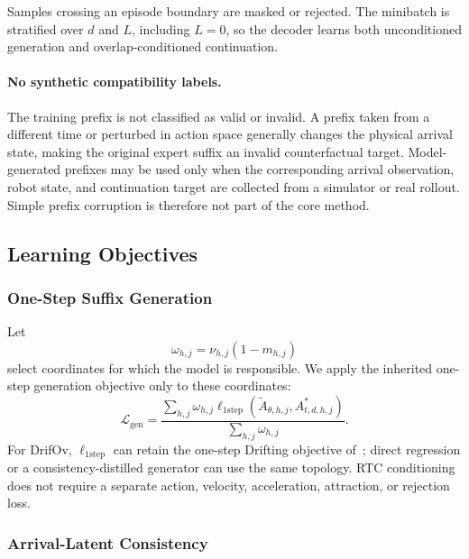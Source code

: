 Samples crossing an episode boundary are masked or rejected.  The minibatch is
stratified over \(d\) and \(L\), including \(L=0\), so the decoder learns both
unconditioned generation and overlap-conditioned continuation.

\paragraph{No synthetic compatibility labels.}
The training prefix is not classified as valid or invalid.  A prefix taken from
a different time or perturbed in action space generally changes the physical
arrival state, making the original expert suffix an invalid counterfactual
target.  Model-generated prefixes may be used only when the corresponding
arrival observation, robot state, and continuation target are collected from a
simulator or real rollout.  Simple prefix corruption is therefore not part of
the core method.

\subsection{Learning Objectives}

\subsubsection{One-Step Suffix Generation}

Let
\begin{equation}
    \omega_{h,j}
    =
    \nu_{h,j}(1-m_{h,j})
\end{equation}
select coordinates for which the model is responsible.  We apply the inherited
one-step generation objective only to these coordinates:
\begin{equation}
    \mathcal{L}_{\mathrm{gen}}
    =
    \frac{
        \sum_{h,j}
        \omega_{h,j}
        \ell_{\mathrm{1step}}
        \left(
            \widetilde A_{\theta,h,j},
            A_{t,d,h,j}^{*}
        \right)
    }{
        \sum_{h,j}\omega_{h,j}
    }.
    \label{eq:generation_loss}
\end{equation}
For DrifOv, \(\ell_{\mathrm{1step}}\) can retain the one-step Drifting objective
of~\cite{yang2026implicitdrifting}; direct regression or a consistency-distilled
generator can use the same topology.  RTC conditioning does not require a
separate action, velocity, acceleration, attraction, or rejection loss.

\subsubsection{Arrival-Latent Consistency}


